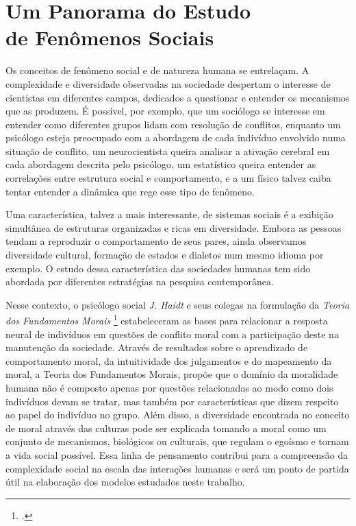 

\chapter{Um Panorama do Estudo\\de Fenômenos Sociais}
\label{ch:C1}

Os conceitos de fenômeno social e de natureza humana se entrelaçam.
A complexidade e diversidade observadas na sociedade despertam o interesse de cientistas em diferentes campos, dedicados a questionar e entender os mecanismos que as produzem.
É possível, por exemplo, que um sociólogo se interesse em entender como diferentes grupos lidam com resolução de conflitos, enquanto um psicólogo esteja preocupado com a abordagem de cada indivíduo envolvido numa situação de conflito, um neurocientista queira analisar a ativação cerebral em cada abordagem descrita pelo psicólogo, um estatístico queira entender as correlações entre estrutura social e comportamento, e a um físico talvez caiba tentar entender a dinâmica que rege esse tipo de fenômeno.

Uma característica, talvez a mais interessante, de sistemas sociais é a exibição simultânea de estruturas organizadas e ricas em diversidade.
Embora as pessoas tendam a reproduzir o comportamento de seus pares, ainda observamos diversidade cultural, formação de estados e dialetos num mesmo idioma por exemplo.
O estudo dessa característica das sociedades humanas tem sido abordada por diferentes estratégias na pesquisa contemporânea.

Nesse contexto, o psicólogo social \emph{J. Haidt} e seus colegas na formulação da \emph{Teoria dos Fundamentos Morais} \footcite{Haidt2007,Graham2011} estabeleceram as bases para relacionar a resposta neural de indivíduos em questões de conflito moral com a participação deste na manutenção da sociedade.
Através de resultados sobre o aprendizado de comportamento moral, da intuitividade dos julgamentos e do mapeamento da moral, a Teoria dos Fundamentos Morais, propõe que o domínio da moralidade humana não é composto apenas por questões relacionadas ao modo como dois indivíduos devam se tratar, mas também por características que dizem respeito ao papel do indivíduo no grupo.
Além disso, a diversidade encontrada no conceito de moral através das culturas pode ser explicada tomando a moral como um conjunto de mecanismos, biológicos ou culturais, que regulam o egoísmo e tornam a vida social possível.
Essa linha de pensamento contribui para a compreensão da complexidade social na escala das interações humanas e será um ponto de partida útil na elaboração dos modelos estudados neste trabalho.

